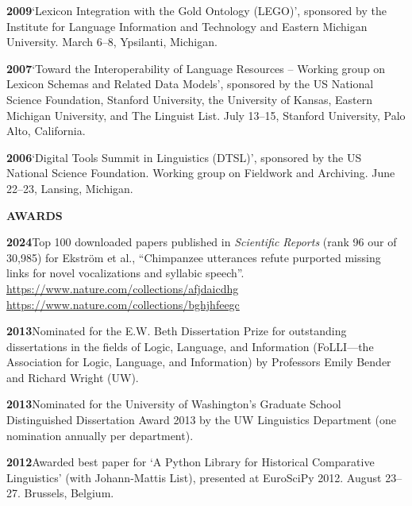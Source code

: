 \documentclass[11pt]{article}
\newcommand{\hangpara}{
 \setlength{\parindent}{0in} %
 \hangindent=0.42in %
}
\begin{document}
\vskip 6pt
\hangpara
{\bf 2009}\hspace{1ex}`Lexicon Integration with the Gold Ontology (LEGO)', sponsored by the Institute for Language Information and Technology and Eastern Michigan University. March 6--8, Ypsilanti, Michigan.

\vskip 6pt
\hangpara
{\bf 2007}\hspace{1ex}`Toward the Interoperability of Language Resources -- Working group on Lexicon Schemas and Related Data Models', sponsored by the US National Science Foundation, Stanford University, the University of Kansas, Eastern Michigan University, and The Linguist List. July 13--15, Stanford University, Palo Alto, California.

\vskip 6pt
\hangpara
{\bf 2006}\hspace{1ex}`Digital Tools Summit in Linguistics (DTSL)', sponsored by the US National Science Foundation. Working group on Fieldwork and Archiving. June 22--23, Lansing, Michigan.


\vskip 20pt
\begin{flushleft}
{\bf AWARDS}
\end{flushleft}

\hangpara
{\bf 2024}\hspace{1ex}Top 100 downloaded papers published in \textit{Scientific Reports} (rank 96 our of 30,985) for Ekström et al., ``Chimpanzee utterances refute purported missing links for novel vocalizations and syllabic speech''. \url{https://www.nature.com/collections/afjdaicdhg}\\ \url{https://www.nature.com/collections/bghjhfeegc}


\vskip 6pt
\hangpara
{\bf 2013}\hspace{1ex}Nominated for the E.W. Beth Dissertation Prize for outstanding dissertations in the fields of Logic, Language, and Information (FoLLI---the Association for Logic, Language, and Information) by Professors Emily Bender and Richard Wright (UW).

\vskip 6pt
\hangpara
{\bf 2013}\hspace{1ex}Nominated for the University of Washington's Graduate School Distinguished Dissertation Award 2013 by the UW Linguistics Department (one nomination annually per department).

\vskip 6pt
\hangpara
{\bf 2012}\hspace{1ex}Awarded best paper for `A Python Library for Historical Comparative Linguistics' (with Johann-Mattis List), presented at EuroSciPy 2012. August 23--27. Brussels, Belgium.
\end{document}
